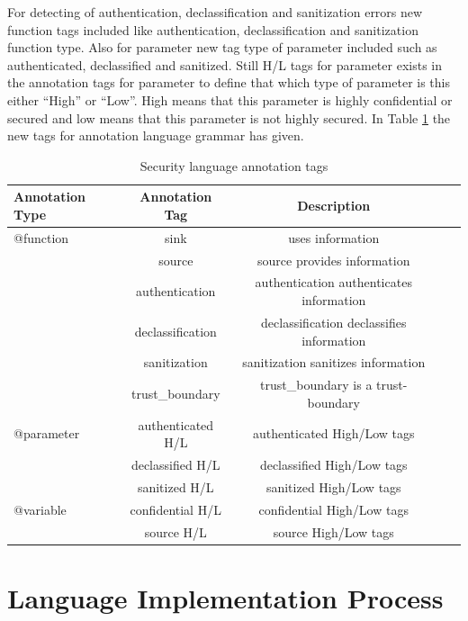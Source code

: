 For detecting of authentication, declassification and sanitization errors new function tags included like authentication, declassification and sanitization function type. Also for parameter new tag type of parameter included such as authenticated, declassified and sanitized. Still H/L tags for parameter exists in the annotation tags for parameter to define that which type of parameter is this either \enquote{High} or \enquote{Low}. High means that this parameter is highly confidential or secured and low means that this parameter is not highly secured. In Table \ref{table:Security_language_annotation_tags} the new tags for annotation language grammar has given. 

\begin{table}
	\centering
\begin{tabular}{l*{3}{c}r}
	\hline
	Annotation Type   & Annotation Tag & Description  \\
	\hline
	@function         & sink  		   & uses information \\
	                  & source         & source provides information	\\
	                  & authentication & authentication authenticates information	\\
	                  & declassification& declassification declassifies information	\\
	                  & sanitization   & sanitization sanitizes information	\\
	                  & trust\_boundary& trust\_boundary is a trust-boundary\\ \hline

	@parameter        & authenticated H/L & authenticated High/Low tags    \\
					  & declassified H/L  & declassified High/Low tags    \\
				      & sanitized H/L     & sanitized High/Low tags    \\ \hline
	@variable         & confidential H/L & confidential High/Low tags\\
					  & source H/L & source High/Low tags   \\
	\hline
	
\end{tabular}
\caption{Security language annotation tags}
\label{table:Security_language_annotation_tags}
\end{table}

\section{Language Implementation Process}

